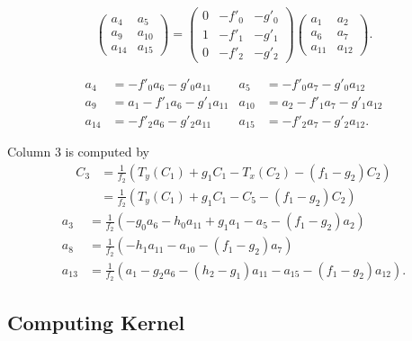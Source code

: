 \[ 
  \begin{pmatrix}
    a_4    & a_5    \\
    a_9    & a_{10} \\
    a_{14} & a_{15}
  \end{pmatrix} = 
  \begin{pmatrix}
    0 & -f'_0 & -g'_0 \\
    1 & -f'_1 & -g'_1 \\
    0 & -f'_2 & -g'_2
  \end{pmatrix}
  \begin{pmatrix}
    a_1    & a_2    \\
    a_6    & a_7    \\
    a_{11} & a_{12}
  \end{pmatrix}.
\]

\begin{align*}
  a_4    &=     - f'_0a_6 - g'_0a_{11} & a_5    &=     - f'_0a_7 - g'_0a_{12} \\
  a_9    &= a_1 - f'_1a_6 - g'_1a_{11} & a_{10} &= a_2 - f'_1a_7 - g'_1a_{12} \\
  a_{14} &=     - f'_2a_6 - g'_2a_{11} & a_{15} &=     - f'_2a_7 - g'_2a_{12}.
\end{align*}

Column 3 is computed by
\begin{align*}
  C_3 &= \frac 1 {f_2} \left( T_y(C_1) + g_1C_1 - T_x(C_2) - (f_1 - g_2)C_2 \right) \\
      &= \frac 1 {f_2} \left( T_y(C_1) + g_1C_1 - C_5 - (f_1 - g_2)C_2 \right)
\end{align*}
\begin{align*}
  a_3    &= \frac 1 {f_2} \left(     - g_0a_6 - h_0a_{11} + g_1a_1    - a_5    - (f_1 - g_2)a_2    \right) \\
  a_8    &= \frac 1 {f_2} \left(              - h_1a_{11}             - a_{10} - (f_1 - g_2)a_7    \right) \\
  a_{13} &= \frac 1 {f_2} \left( a_1 - g_2a_6 - (h_2 - g_1)a_{11}     - a_{15} - (f_1 - g_2)a_{12} \right) .
\end{align*}



\subsection{Computing Kernel}

